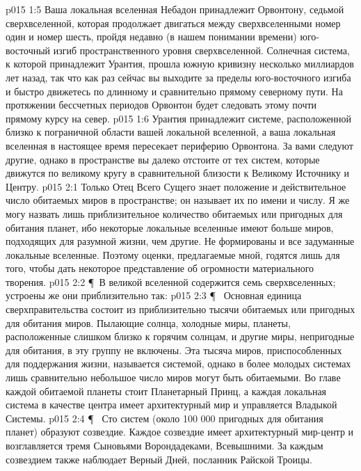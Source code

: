\vs p015 1:5 Ваша локальная вселенная Небадон принадлежит Орвонтону, седьмой сверхвселенной, которая продолжает двигаться между сверхвселенными номер один и номер шесть, пройдя недавно (в нашем понимании времени) юго\hyp{}восточный изгиб пространственного уровня сверхвселенной. Солнечная система, к которой принадлежит Урантия, прошла южную кривизну несколько миллиардов лет назад, так что как раз сейчас вы выходите за пределы юго\hyp{}восточного изгиба и быстро движетесь по длинному и сравнительно прямому северному пути. На протяжении бессчетных периодов Орвонтон будет следовать этому почти прямому курсу на север.
\vs p015 1:6 Урантия принадлежит системе, расположенной близко к пограничной области вашей локальной вселенной, а ваша локальная вселенная в настоящее время пересекает периферию Орвонтона. За вами следуют другие, однако в пространстве вы далеко отстоите от тех систем, которые движутся по великому кругу в сравнительной близости к Великому Источнику и Центру.
\vs p015 2:1 Только Отец Всего Сущего знает положение и действительное число обитаемых миров в пространстве; он называет их по имени и числу. Я же могу назвать лишь приблизительное количество обитаемых или пригодных для обитания планет, ибо некоторые локальные вселенные имеют больше миров, подходящих для разумной жизни, чем другие. Не формированы и все задуманные локальные вселенные. Поэтому оценки, предлагаемые мной, годятся лишь для того, чтобы дать некоторое представление об огромности материального творения.
\vs p015 2:2 \P\ В великой вселенной содержится семь сверхвселенных; устроены же они приблизительно так:
\vs p015 2:3 \P\ \bibnobreakspace {} Основная единица сверхправительства состоит из приблизительно тысячи обитаемых или пригодных для обитания миров. Пылающие солнца, холодные миры, планеты, расположенные слишком близко к горячим солнцам, и другие миры, непригодные для обитания, в эту группу не включены. Эта тысяча миров, приспособленных для поддержания жизни, называется системой, однако в более молодых системах лишь сравнительно небольшое число миров могут быть обитаемыми. Во главе каждой обитаемой планеты стоит Планетарный Принц, а каждая локальная система в качестве центра имеет архитектурный мир и управляется Владыкой Системы.
\vs p015 2:4 \P\ \bibnobreakspace {} Сто систем (около 100 000 пригодных для обитания планет) образуют созвездие. Каждое созвездие имеет архитектурный мир\hyp{}центр и возглавляется тремя Сыновьями Ворондадеками, Всевышними. За каждым созвездием также наблюдает Верный Дней, посланник Райской Троицы.
